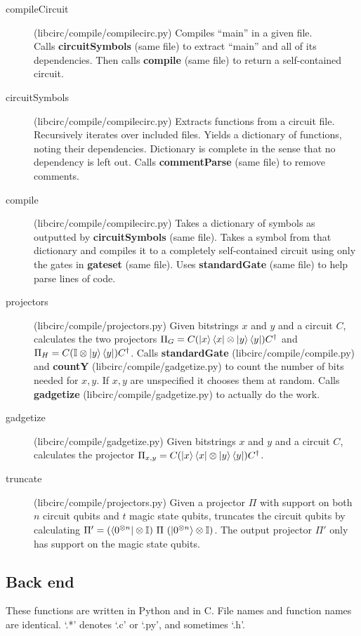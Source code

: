 \documentclass[11pt]{article}
\begin{document}
\begin{description}
    \item[compileCircuit] (libcirc/compile/compilecirc.py) Compiles ``main'' in a given file.\\
        Calls \textbf{circuitSymbols} (same file) to extract ``main'' and all of its dependencies.
        Then calls \textbf{compile} (same file) to return a self-contained circuit.
    \item[circuitSymbols] (libcirc/compile/compilecirc.py) Extracts functions from a circuit file.\\
        Recursively iterates over included files. Yields a dictionary of functions, noting their dependencies. Dictionary is complete in the sense that no dependency is left out.
        Calls \textbf{commentParse} (same file) to remove comments.
    \item[compile] (libcirc/compile/compilecirc.py) Takes a dictionary of symbols as outputted by \textbf{circuitSymbols} (same file). Takes a symbol from that dictionary and compiles it to a completely self-contained circuit using only the gates in \textbf{gateset} (same file). Uses \textbf{standardGate} (same file) to help parse lines of code.
    \item[projectors] (libcirc/compile/projectors.py) Given bitstrings $x$ and $y$ and a circuit $C$, calculates the two projectors $\Pi_G = C(\ket{x}\bra{x} \otimes \ket{y}\bra{y})C^\dagger$ and $\Pi_H = C(\mathbb{I} \otimes \ket{y}\bra{y})C^\dagger$. Calls \textbf{standardGate} (libcirc/compile/compile.py) and \textbf{countY} (libcirc/compile/gadgetize.py) to count the number of bits needed for $x,y$. If $x,y$ are unspecified it chooses them at random. Calls \textbf{gadgetize} (libcirc/compile/gadgetize.py) to actually do the work.
    \item[gadgetize] (libcirc/compile/gadgetize.py) Given bitstrings $x$ and $y$ and a circuit $C$, calculates the projector $\Pi_{x,y} = C(\ket{x}\bra{x} \otimes \ket{y}\bra{y})C^\dagger$.
    \item[truncate] (libcirc/compile/projectors.py) Given a projector $\Pi$ with support on both $n$ circuit qubits and $t$ magic state qubits, truncates the circuit qubits by calculating $\Pi' = (\bra{0^{\otimes n}} \otimes \mathbb{I})\text{ } \Pi \text{ } (\ket{0^{\otimes n}} \otimes \mathbb{I})$. The output projector $\Pi'$ only has support on the magic state qubits.
\end{description} 


\subsection{Back end}
These functions are written in Python and in C. File names and function names are identical. `.*' denotes `.c' or `.py', and sometimes `.h'.
\end{document}
